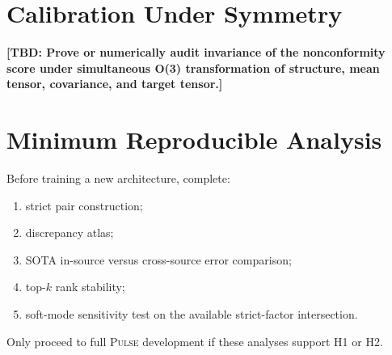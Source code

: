 \documentclass[11pt]{article}
\newcommand{\TBD}[1]{\textcolor{red!75!black}{\textbf{[TBD: #1]}}}
\newcommand{\PULSE}{\textsc{Pulse}}
\begin{document}
\section{Calibration Under Symmetry}

\TBD{Prove or numerically audit invariance of the nonconformity score under simultaneous O(3) transformation of structure, mean tensor, covariance, and target tensor.}

\section{Minimum Reproducible Analysis}

Before training a new architecture, complete:
\begin{enumerate}[leftmargin=1.5em]
    \item strict pair construction;
    \item discrepancy atlas;
    \item SOTA in-source versus cross-source error comparison;
    \item top-$k$ rank stability;
    \item soft-mode sensitivity test on the available strict-factor intersection.
\end{enumerate}
Only proceed to full \PULSE{} development if these analyses support H1 or H2.
\end{document}
